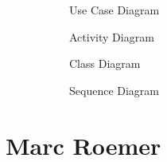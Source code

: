 \documentclass{article}
\begin{document}
	
		\begin{figure}[htbp]
			\centering
			\begin{subfigure}{\textwidth}
				\centering
				
				\caption{Use Case Diagram}
			\end{subfigure}
			\begin{subfigure}{\textwidth}
			\end{subfigure}
		\end{figure}
		\clearpage
		
		\begin{figure}[htbp]
			\centering
			\begin{subfigure}{\textwidth}
				\centering
				
				\caption{Activity Diagram}
			\end{subfigure}
			\begin{subfigure}{\textwidth}
			\end{subfigure}
		\end{figure}
		\clearpage
		
		\begin{figure}[htbp]
			\centering
			\begin{subfigure}{\textwidth}
				\centering
				
				\caption{Class Diagram}
			\end{subfigure}
			\begin{subfigure}{\textwidth}
				\vspace{1em}
				\end{subfigure}
		\end{figure}
		\clearpage
		
		\begin{figure}[htbp]
			\centering
			\begin{subfigure}{\textwidth}
				\centering
				
				\caption{Sequence Diagram}
			\end{subfigure}
			\begin{subfigure}{\textwidth}
			
			\end{subfigure}
		\end{figure} 
		\clearpage


	

\section{Marc Roemer}
\end{document}
